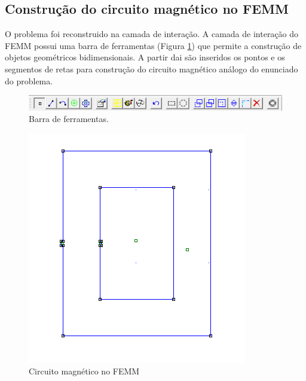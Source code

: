 \subsection{Construção do circuito magnético no FEMM}
O problema foi reconstruido na camada de interação. A camada de interação do FEMM possui uma barra de ferramentas (Figura \ref{ferramentas}) que permite a construção de objetos geométricos bidimensionais. A partir dai são inseridos os pontos e os segmentos de retas para construção do circuito magnético análogo do enunciado do problema.
\begin{figure}[H]
\centering
\includegraphics[scale=1]{img/ferram.png}
\caption[Barra de ferramentas]{Barra de ferramentas.}
\label{ferramentas}
\end{figure}

\begin{figure}[H]
\centering
\includegraphics[scale=0.65]{img/circ_mag1.png}
\caption[Circuito magnético no FEMM]{Circuito magnético no FEMM}
\label{circ_mag}
\end{figure}

